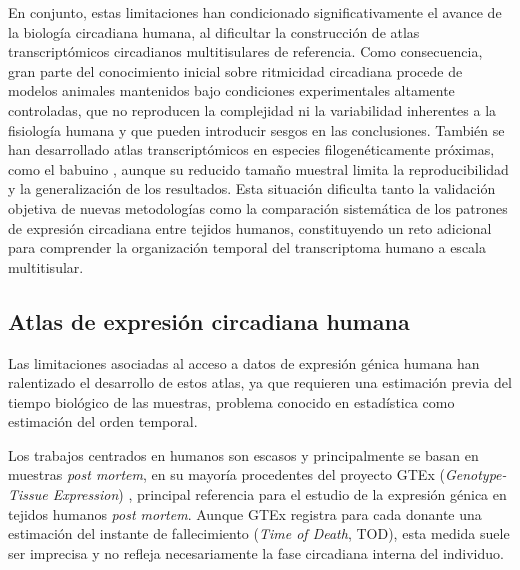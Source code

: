 \documentclass[12pt, a4paper]{report}
\begin{document}
En conjunto, estas limitaciones han condicionado significativamente el avance de la biología circadiana humana, al dificultar la construcción de atlas transcriptómicos circadianos multitisulares de referencia. Como consecuencia, gran parte del conocimiento inicial sobre ritmicidad circadiana procede de modelos animales mantenidos bajo condiciones experimentales altamente controladas, que no reproducen la complejidad ni la variabilidad inherentes a la fisiología humana y que pueden introducir sesgos en las conclusiones\cite{zhang2014}. También se han desarrollado atlas transcriptómicos en especies filogenéticamente próximas, como el babuino \cite{mure2018}, aunque su reducido tamaño muestral limita la reproducibilidad y la generalización de los resultados. Esta situación dificulta tanto la validación objetiva de nuevas metodologías como la comparación sistemática de los patrones de expresión circadiana entre tejidos humanos, constituyendo un reto adicional para comprender la organización temporal del transcriptoma humano a escala multitisular.

\subsection{Atlas de expresión circadiana humana}

Las limitaciones asociadas al acceso a datos de expresión génica humana han ralentizado el desarrollo de estos atlas, ya que requieren una estimación previa del tiempo biológico de las muestras, problema conocido en estadística como estimación del orden temporal.

Los trabajos centrados en humanos son escasos y principalmente se basan en muestras \textit{post mortem}, en su mayoría procedentes del proyecto GTEx (\textit{Genotype-Tissue Expression}) \cite{gtex2020}, principal referencia para el estudio de la expresión génica en tejidos humanos \textit{post mortem}. Aunque GTEx registra para cada donante una estimación del instante de fallecimiento (\textit{Time of Death}, TOD), esta medida suele ser imprecisa y no refleja necesariamente la fase circadiana interna del individuo.
\end{document}
